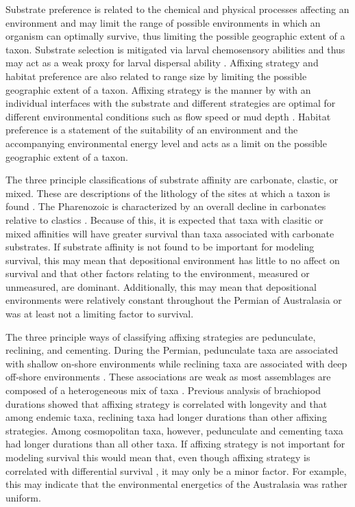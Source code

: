 \documentclass[12pt,letterpaper]{article}
\begin{document}
Substrate preference is related to the chemical and physical processes affecting an environment and may limit the range of possible environments in which an organism can optimally survive, thus limiting the possible geographic extent of a taxon. Substrate selection is mitigated via larval chemosensory abilities and thus may act as a weak proxy for larval dispersal ability \citep{Jablonski2006a,Jablonski1983}. Affixing strategy and habitat preference are also related to range size by limiting the possible geographic extent of a taxon. Affixing strategy is the manner by with an individual interfaces with the substrate and different strategies are optimal for different environmental conditions such as flow speed or mud depth \citep{Alexander1977,LaBarbera1978,LaBarbera1981}. Habitat preference is a statement of the suitability of an environment and the accompanying environmental energy level and acts as a limit on the possible geographic extent of a taxon. 

The three principle classifications of substrate affinity are carbonate, clastic, or mixed. These are descriptions of the lithology of the sites at which a taxon is found \citep{Foote2006,Anderson2011a,Nurnberg2013a,Kiessling2007a,Miller2001}. The Pharenozoic is characterized by an overall decline in carbonates relative to clastics \citep{Foote2006,Miller2001}. Because of this, it is expected that taxa with clasitic or mixed affinities will have greater survival than taxa associated with carbonate substrates. If substrate affinity is not found to be important for modeling survival, this may mean that depositional environment has little to no affect on survival and that other factors relating to the environment, measured or unmeasured, are dominant. Additionally, this may mean that depositional environments were relatively constant throughout the Permian of Australasia or was at least not a limiting factor to survival.

The three principle ways of classifying affixing strategies are pedunculate, reclining, and cementing. During the Permian, pedunculate taxa are associated with shallow on-shore environments while reclining taxa are associated with deep off-shore environments \citep{Clapham2007}. These associations are weak as most assemblages are composed of a heterogeneous mix of taxa \citep{Clapham2007}. Previous analysis of brachiopod durations showed that affixing strategy is correlated with longevity \citep{Alexander1977} and that among endemic taxa, reclining taxa had longer durations than other affixing strategies. Among cosmopolitan taxa, however, pedunculate and cementing taxa had longer durations than all other taxa. If affixing strategy is not important for modeling survival this would mean that, even though affixing strategy is correlated with differential survival \citep{Alexander1977}, it may only be a minor factor. For example, this may indicate that the environmental energetics of the Australasia was rather uniform. 
\end{document}
